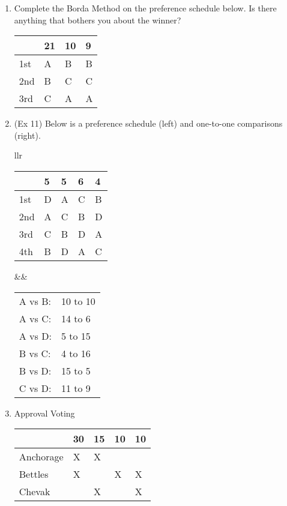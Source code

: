 \documentclass[12pt]{article}
\begin{document}
\begin{enumerate}
\item Complete the Borda Method on the preference schedule below. Is there anything that bothers you about the winner?

\begin{tabular}{l || lll}
& 21&10&9\\
\hline
1st&A&B&B\\
2nd&B&C&C\\
3rd&C&A&A\\
\end{tabular}

\vfill
	
\item  (Ex 11) Below is a preference schedule (left) and one-to-one comparisons (right).\\

\begin{tabular}{llr}
\begin{tabular}{l || llll}
&5&5&6&4\\
\hline
1st&D&A&C&B\\
2nd&A&C&B&D\\
3rd&C&B&D&A\\
4th&B&D&A&C\\
\end{tabular}
&\quad&
\begin{tabular}{ll}
A vs B: & 10 to 10 \\
A vs C: & 14 to 6\\
A vs D:  & 5 to 15\\
B vs C: & 4 to 16\\
B vs D: &15 to 5 \\
C vs D: & 11 to 9 \\
\end{tabular}
\end{tabular}
\vspace{4.5in}
\newpage
\item Approval Voting\\

\begin{tabular}{l || llll}
& 30&15&10&10\\
\hline
Anchorage&X&X&&\\
Bettles&X&&X&X\\
Chevak&&X&&X\\
\end{tabular}
\end{enumerate}
\end{document}

